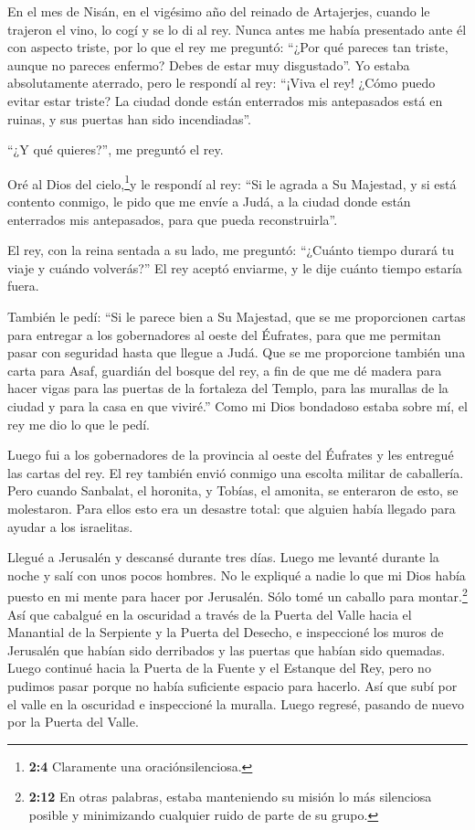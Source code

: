  En el mes de Nisán, en el vigésimo año del reinado de
Artajerjes, cuando le trajeron el vino, lo cogí y se lo di al rey. Nunca
antes me había presentado ante él con aspecto triste,  por
lo que el rey me preguntó: ``¿Por qué pareces tan triste, aunque no
pareces enfermo? Debes de estar muy disgustado''. Yo estaba
absolutamente aterrado,  pero le respondí al rey: ``¡Viva el
rey! ¿Cómo puedo evitar estar triste? La ciudad donde están enterrados
mis antepasados está en ruinas, y sus puertas han sido incendiadas''.

 ``¿Y qué quieres?'', me preguntó el rey.

Oré al Dios del cielo,\footnote{\textbf{2:4} Claramente una
  oraciónsilenciosa.}y le respondí al rey:  ``Si le agrada a
Su Majestad, y si está contento conmigo, le pido que me envíe a Judá, a
la ciudad donde están enterrados mis antepasados, para que pueda
reconstruirla''.

 El rey, con la reina sentada a su lado, me preguntó:
``¿Cuánto tiempo durará tu viaje y cuándo volverás?'' El rey aceptó
enviarme, y le dije cuánto tiempo estaría fuera.

 También le pedí: ``Si le parece bien a Su Majestad, que se
me proporcionen cartas para entregar a los gobernadores al oeste del
Éufrates, para que me permitan pasar con seguridad hasta que llegue a
Judá.  Que se me proporcione también una carta para Asaf,
guardián del bosque del rey, a fin de que me dé madera para hacer vigas
para las puertas de la fortaleza del Templo, para las murallas de la
ciudad y para la casa en que viviré.'' Como mi Dios bondadoso estaba
sobre mí, el rey me dio lo que le pedí.

 Luego fui a los gobernadores de la provincia al oeste del
Éufrates y les entregué las cartas del rey. El rey también envió conmigo
una escolta militar de caballería.  Pero cuando Sanbalat,
el horonita, y Tobías, el amonita, se enteraron de esto, se molestaron.
Para ellos esto era un desastre total: que alguien había llegado para
ayudar a los israelitas.

 Llegué a Jerusalén y descansé durante tres días.
 Luego me levanté durante la noche y salí con unos pocos
hombres. No le expliqué a nadie lo que mi Dios había puesto en mi mente
para hacer por Jerusalén. Sólo tomé un caballo para montar.\footnote{\textbf{2:12}
  En otras palabras, estaba manteniendo su misión lo más silenciosa
  posible y minimizando cualquier ruido de parte de su grupo.}
 Así que cabalgué en la oscuridad a través de la Puerta del
Valle hacia el Manantial de la Serpiente y la Puerta del Desecho, e
inspeccioné los muros de Jerusalén que habían sido derribados y las
puertas que habían sido quemadas.  Luego continué hacia la
Puerta de la Fuente y el Estanque del Rey, pero no pudimos pasar porque
no había suficiente espacio para hacerlo.  Así que subí por
el valle en la oscuridad e inspeccioné la muralla. Luego regresé,
pasando de nuevo por la Puerta del Valle.

